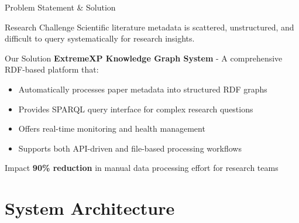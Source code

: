 \documentclass[aspectratio=169]{beamer}
\begin{document}
\begin{frame}{Problem Statement \& Solution}
    \begin{block}{Research Challenge}
        Scientific literature metadata is scattered, unstructured, and difficult to query systematically for research insights.
    \end{block}
    
    \vspace{0.3cm}
    
    \begin{block}{Our Solution}
        \textbf{ExtremeXP Knowledge Graph System} - A comprehensive RDF-based platform that:
        \begin{itemize}
            \item Automatically processes paper metadata into structured RDF graphs
            \item Provides SPARQL query interface for complex research questions
            \item Offers real-time monitoring and health management
            \item Supports both API-driven and file-based processing workflows
        \end{itemize}
    \end{block}
    
    \vspace{0.3cm}
    
    \begin{alertblock}{Impact}
        \textbf{90\% reduction} in manual data processing effort for research teams
    \end{alertblock}
\end{frame}

\section{System Architecture}
\end{document}
